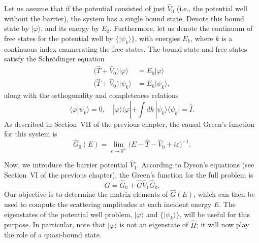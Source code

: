 \documentclass[pra,12pt]{revtex4}
\begin{document}
Let us assume that if the potential consisted of just $\hat{V}_0$
(i.e., the potential well without the barrier), the system has a
single bound state.  Denote this bound state by $|\varphi\rangle$, and
its energy by $E_0$.  Furthermore, let us denote the continuum of free
states for the potential well by $\{|\psi_k\rangle\}$, with energies
$E_k$, where $k$ is a continuous index enumerating the free states.
The bound state and free states satisfy the Schr\"odinger equation
$$\begin{aligned}\big(\hat{T} + \hat{V}_0\big) |\varphi\rangle &= E_0 |\varphi\rangle \\ \big(\hat{T} + \hat{V}_0\big) |\psi_k\rangle &= E_k |\psi_k\rangle,
\end{aligned}$$
along with the orthogonality and completeness relations
$$\langle\varphi|\psi_k\rangle = 0, \quad |\varphi\rangle\langle\varphi| + \int dk\, |\psi_k\rangle\langle\psi_k| = \hat{I}.$$
As described in Section~VII of the previous chapter, the causal
Green's function for this system is
$$\hat{G}_0(E) = \lim_{\varepsilon\rightarrow0^+} \Big(E - \hat{T} - \hat{V}_0 + i\varepsilon\Big)^{-1}.$$

Now, we introduce the barrier potential $\hat{V}_1$.  According to
Dyson's equations (see Section~VI of the previous chapter), the
Green's function for the full problem is
$$\hat{G} = \hat{G}_0 + \hat{G} \hat{V}_1 \hat{G}_0.$$
Our objective is to determine the matrix elements of $\hat{G}(E)$,
which can then be used to compute the scattering amplitudes at each
incident energy $E$.  The eigenstates of the potential well problem,
$|\varphi\rangle$ and $\{|\psi_k\rangle\}$, will be useful for this
purpose.  In particular, note that $|\varphi\rangle$ is not an
eigenstate of $\hat{H}$; it will now play the role of a quasi-bound
state.
\end{document}
